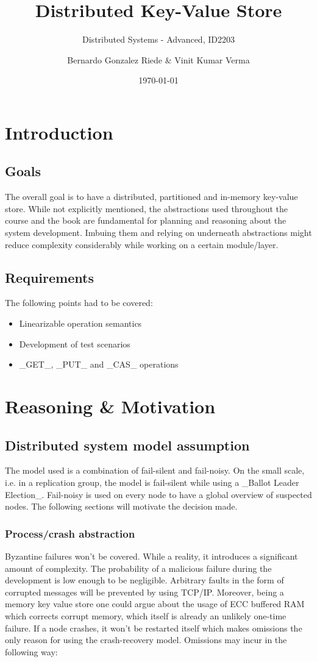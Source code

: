 \documentclass[a4paper]{scrartcl}
\title{Distributed Key-Value Store}
\subtitle{Distributed Systems - Advanced, ID2203}
\author{Bernardo Gonzalez Riede \& Vinit Kumar Verma}
\date{\today}
\begin{document}
\maketitle

\section{Introduction}

\subsection{Goals}
The overall goal is to have a distributed, partitioned and in-memory key-value store. 
While not explicitly mentioned, the abstractions used throughout the course and the book are fundamental for planning and reasoning about the system development. Imbuing them and relying on underneath abstractions might reduce complexity considerably while working on a certain module/layer. 

\subsection{Requirements}
The following points had to be covered:
\begin{itemize}
\item Linearizable operation semantics
\item Development of test scenarios
\item _GET_, _PUT_ and _CAS_ operations
\end{itemize}

\section{Reasoning \& Motivation}

\subsection{Distributed system model assumption}

The model used is a combination of fail-silent and fail-noisy. On the small scale, i.e. in a replication group, the model is fail-silent while using a _Ballot Leader Election_. Fail-noisy is used on every node to have a global overview of suspected nodes.
The following sections will motivate the decision made.

\subsubsection{Process/crash abstraction}
Byzantine failures won’t be covered. While a reality, it introduces a significant amount of complexity. The probability of a malicious failure during the development is low enough to be negligible. Arbitrary faults in the form of corrupted messages will be prevented by using TCP/IP. Moreover, being a memory key value store one could argue about the usage of ECC buffered RAM which corrects corrupt memory, which itself is already an unlikely one-time failure.
If a node crashes, it won’t be restarted itself which makes omissions the only reason for using the crash-recovery model. Omissions may incur in the following way:
\end{document}
